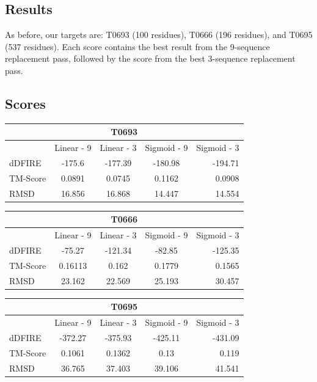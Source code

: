 \documentclass{article}
\begin{document}
\begin{enumerate}
\section{Results}

As before, our targets are: T0693 (100 residues), T0666 (196 residues), and T0695 (537 residues).  Each score contains the best result from the 9-sequence replacement pass, followed by the score from the best 3-sequence replacement pass.

\subsection{Scores}
\begin{center}
\begin{tabular}{|l|c|c|c|r|}
\multicolumn{5}{c}{T0693} \\
    \hline
      & Linear - 9 & Linear - 3 & Sigmoid - 9 & Sigmoid - 3\\ \hline
    dDFIRE & -175.6 & -177.39 & -180.98 & -194.71 \\ \hline
    TM-Score & 0.0891 & 0.0745 & 0.1162 & 0.0908 \\ \hline
    RMSD & 16.856 & 16.868 & 14.447 & 14.554 \\
    \hline
    \end{tabular}
\end{center}

\begin{center}
\begin{tabular}{|l|c|c|c|r|}
\multicolumn{5}{c}{T0666} \\
    \hline
      & Linear - 9 & Linear - 3 & Sigmoid - 9 & Sigmoid - 3\\ \hline
    dDFIRE & -75.27 & -121.34 & -82.85 & -125.35 \\ \hline
    TM-Score & 0.16113 & 0.162 & 0.1779 & 0.1565 \\ \hline
    RMSD & 23.162 & 22.569 & 25.193 & 30.457 \\
    \hline
    \end{tabular}
\end{center}

\begin{center}
\begin{tabular}{|l|c|c|c|r|}
\multicolumn{5}{c}{T0695} \\
    \hline
      & Linear - 9 & Linear - 3 & Sigmoid - 9 & Sigmoid - 3\\ \hline
    dDFIRE &  -372.27 & -375.93 & -425.11 & -431.09 \\ \hline
    TM-Score & 0.1061 & 0.1362 & 0.13 & 0.119 \\ \hline
    RMSD & 36.765 & 37.403 & 39.106 & 41.541 \\
    \hline
    \end{tabular}
\end{center}


\end{enumerate}
\end{document}
